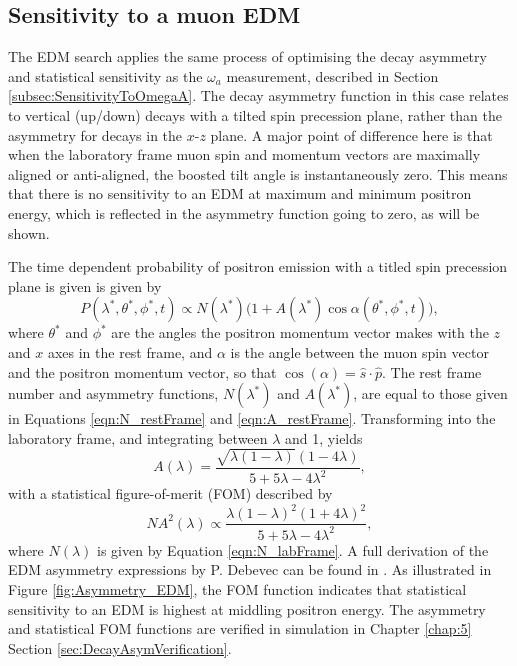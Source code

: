 
\subsection{Sensitivity to a muon EDM}\label{subsec:EDMSensitivity}

The EDM search applies the same process of optimising the decay asymmetry and statistical sensitivity as the $\omega_{a}$ measurement, described in Section \ref{subsec:SensitivityToOmegaA}. The decay asymmetry function in this case relates to vertical (up/down) decays with a tilted spin precession plane, rather than the asymmetry for decays in the $x$-$z$ plane. A major point of difference here is that when the laboratory frame muon spin and momentum vectors are maximally aligned or anti-aligned, the boosted tilt angle is instantaneously zero. This means that there is no sensitivity to an EDM at maximum and minimum positron energy, which is reflected in the asymmetry function going to zero, as will be shown.

The time dependent probability of positron emission with a titled spin precession plane is given is given by
%
%
\begin{equation}
  P(\lambda^{*}, \theta^{*}, \phi^{*}, t) \propto N(\lambda^{*}) \Big( 1+A(\lambda^{*})\cos\alpha(\theta^{*}, \phi^{*}, t)\Big), 
\end{equation}
%
where $\theta^{*}$ and $\phi^{*}$ are the angles the positron momentum vector makes with the $z$ and $x$ axes in the rest frame, and $\alpha$ is the angle between the muon spin vector and the positron momentum vector, so that $\cos(\alpha)=\hat{s}\cdot\hat{p}$. The rest frame number and asymmetry functions, $N(\lambda^{*})$ and $A(\lambda^{*})$, are equal to those given in Equations \ref{eqn:N_restFrame} and \ref{eqn:A_restFrame}. Transforming into the laboratory frame, and integrating between $\lambda$ and 1, yields
%
\begin{equation}
  A(\lambda) = \frac{\sqrt{\lambda(1-\lambda)}(1-4\lambda)}{5+5\lambda-4\lambda^{2}},
  \label{eqn:AEDM_labFrame}
\end{equation}
%
with a statistical figure-of-merit (FOM) described by 
%
\begin{equation}
  NA^{2}(\lambda) \propto \frac{\lambda(1-\lambda)^{2}(1+4\lambda)^{2}}{5+5\lambda-4\lambda^{2}},
  \label{eqn:FOMEDM_labFrame}
\end{equation}
%
where $N(\lambda)$ is given by Equation \ref{eqn:N_labFrame}. A full derivation of the EDM asymmetry expressions by P. Debevec can be found in \cite{PaulEDMNote}. As illustrated in Figure \ref{fig:Asymmetry_EDM}, the FOM function indicates that statistical sensitivity to an EDM is highest at middling positron energy. The asymmetry and statistical FOM functions are verified in simulation in Chapter \ref{chap:5} Section \ref{sec:DecayAsymVerification}. 

